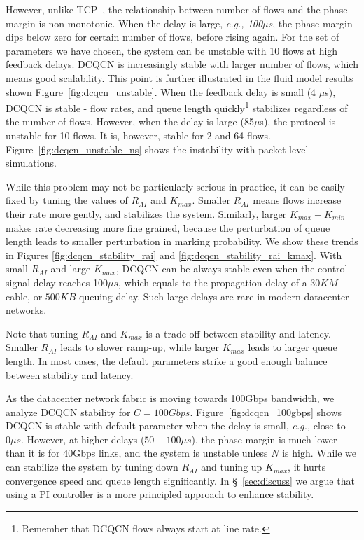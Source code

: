 However, unlike TCP~\cite{misra2000fluid}, the relationship between number of
flows and the phase margin is non-monotonic. When the delay is large, {\em e.g.,
100$\mu$s}, the phase margin dips below zero for certain number of flows, before
rising again.  For the set of parameters we have chosen, the system can be
unstable with 10 flows at high feedback delays.  DCQCN is increasingly stable
with larger number of flows, which means good scalability. This point is further
illustrated in the fluid model results shown Figure~\ref{fig:dcqcn_unstable}.
When the feedback delay is small (4 $\mu$s), DCQCN is stable - flow rates, and
queue length quickly\footnote{Remember that DCQCN flows always start at line
rate.} stabilizes regardless of the number of flows. However, when the delay is
large (85$\mu$s), the protocol is unstable for 10 flows. It is, however, stable
for 2 and 64 flows. Figure~\ref{fig:dcqcn_unstable_ns} shows the instability
with packet-level simulations.

While this problem may not be particularly serious in practice, it can be easily
fixed by tuning the values of $R_{AI}$ and $K_{max}$.  Smaller $R_{AI}$ means
flows increase their rate more gently, and stabilizes the system.  Similarly,
larger $K_{max} - K_{min}$ makes rate decreasing more fine grained, because the
perturbation of queue length leads to smaller perturbation in marking
probability.  We show these trends in Figures \ref{fig:dcqcn_stability_rai} and
\ref{fig:dcqcn_stability_rai_kmax}.  With small $R_{AI}$ and large $K_{max}$,
DCQCN can be always stable even when the control signal delay reaches 100$\mu
s$, which equals to the propagation delay of a $30KM$ cable, or $500KB$ queuing
delay. Such large delays are rare in modern datacenter networks. 

Note that tuning $R_{AI}$ and $K_{max}$ is a trade-off between stability and
latency. Smaller $R_{AI}$ leads to slower ramp-up, while larger $K_{max}$ leads
to larger queue length. In most cases, the default parameters strike a good
enough balance between stability and latency.

  As the datacenter network fabric is moving towards
100Gbps bandwidth, we analyze DCQCN stability for $C=100Gbps$.
Figure~\ref{fig:dcqcn_100gbps} shows DCQCN is stable with default parameter when
the delay is small, {\em e.g.,} close to $0\mu s$. However, at higher delays
($50-100 \mu s$), the phase margin is much lower than it is for 40Gbps links, and
the system is unstable unless $N$ is high. While we can stabilize the system by
tuning down $R_{AI}$ and tuning up $K_{max}$, it hurts convergence speed and
queue length significantly. In \S~\ref{sec:discuss} we argue that using a PI
controller is a more principled approach to enhance stability.
